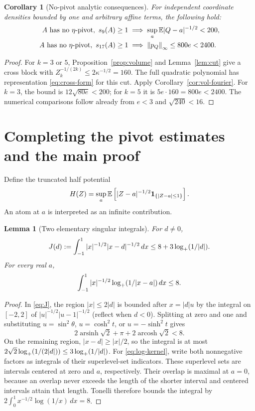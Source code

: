 \documentclass[11pt]{article}
\numberwithin{equation}{section}
\newtheorem{lemma}[theorem]{Lemma}
\newtheorem{corollary}[theorem]{Corollary}
\theoremstyle{definition}\newtheorem{definition}[theorem]{Definition}
\theoremstyle{remark}\newtheorem{remark}[theorem]{Remark}
\newcommand{\1}{\mathbf 1}\newcommand{\diag}{\operatorname{diag}}
\newcommand{\norm}[1]{\left\lVert#1\right\rVert}\newcommand{\abs}[1]{\left|#1\right|}
\begin{document}
\begin{corollary}[No-pivot analytic consequences]\label{cor:no-pivot}
For independent coordinate densities bounded by one and arbitrary affine terms, the following hold:
\begin{align}
 A\text{ has no }\eta\text{-pivot},\ s_9(A)\ge1
 &\implies \sup_a\E|Q-a|^{-1/2}<200,\label{eq:no-pivot-nine}\\
 A\text{ has no }\eta\text{-pivot},\ s_{17}(A)\ge1
 &\implies \norm{p_Q}_\infty\le800e<2400.\label{eq:no-pivot-seventeen}
\end{align}
\end{corollary}
\begin{proof}
For $k=3$ or $5$, Proposition~\ref{prop:volume} and Lemma~\ref{lem:cut} give a cross block with
$Z_k^{-1/(2k)}\le2\kappa^{-1/2}=160$.
The full quadratic polynomial has representation \eqref{eq:cross-form} for this cut. Apply Corollary~\ref{cor:vol-fourier}. For $k=3$, the bound is $12\sqrt{80e}<200$; for $k=5$ it is $5e\cdot160=800e<2400$. The numerical comparisons follow already from $e<3$ and $\sqrt{240}<16$.
\end{proof}

\section{Completing the pivot estimates and the main proof}\label{sec:finish}
Define the truncated half potential
\begin{equation}\label{eq:H}
 H(Z)=\sup_a\E\left[|Z-a|^{-1/2}\1_{\{|Z-a|\le1\}}\right].
\end{equation}
An atom at $a$ is interpreted as an infinite contribution.

\begin{lemma}[Two elementary singular integrals]\label{lem:kernels}
For $d\ne0$,
\begin{equation}\label{eq:J}
 J(d):=\int_{-1}^1|x|^{-1/2}|x-d|^{-1/2}\,dx
 \le8+3\log_+(1/|d|).
\end{equation}
For every real $a$,
\begin{equation}\label{eq:log-kernel}
 \int_{-1}^1|x|^{-1/2}\log_+(1/|x-a|)\,dx\le8.
\end{equation}
\end{lemma}
\begin{proof}
In \eqref{eq:J}, the region $|x|\le2|d|$ is bounded after $x=|d|u$ by the integral on $[-2,2]$ of $|u|^{-1/2}|u-1|^{-1/2}$ (reflect when $d<0$). Splitting at zero and one and substituting $u=\sin^2\theta$, $u=\cosh^2 t$, or $u=-\sinh^2t$ gives
\[
 2\operatorname{arsinh}\sqrt2+\pi+2\operatorname{arcosh}\sqrt2<8.
\]
On the remaining region, $|x-d|\ge|x|/2$, so the integral is at most
$2\sqrt2\log_+(1/(2|d|))\le3\log_+(1/|d|)$.
For \eqref{eq:log-kernel}, write both nonnegative factors as integrals of their superlevel-set indicators. These superlevel sets are intervals centered at zero and $a$, respectively. Their overlap is maximal at $a=0$, because an overlap never exceeds the length of the shorter interval and centered intervals attain that length. Tonelli therefore bounds the integral by
$2\int_0^1x^{-1/2}\log(1/x)\,dx=8$.
\end{proof}
\end{document}

